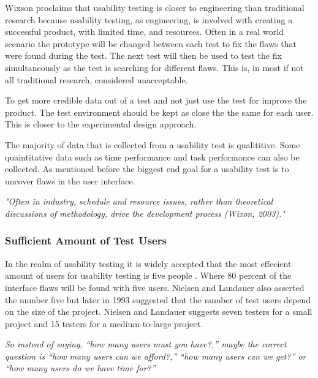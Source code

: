 Wixson proclaims that usability testing is closer to engineering than traditional research because usability testing, as engineering, is involved with creating a successful product, with limited time, and resources. Often in a real world scenario the prototype will be changed between each test to fix the flaws that were found during the test. The next test will then be used to test the fix simultaneously as the test is searching for different flaws. This is, in most if not all traditional research, considered unacceptable. 

To get more credible data out of a test and not just use the test for improve the product. The test environment should be kept as close the the same for each user. This is closer to the experimental design approach. 

The majority of data that is collected from a usability test is qualititive. Some quaintitative data such as time performance and task performance can also be collected. As mentioned before the biggest end goal for a usability test is to uncover flaws in the user interface. 

\textit{"Often in industry, schedule and resource issues, rather than theoretical discussions of methodology, drive the development process (Wixon, 2003)."}

\subsubsection{Sufficient Amount of Test Users}%
\label{ssub:Sufficient Amount of Test Users}
In the realm of usability testing it is widely accepted that the most effecient amount of users for usability testing is five people \cite{virzi1992refining}. Where 80 percent of the interface flaws will be found with five users. Nielsen and Landauer also asserted the number five but later in 1993 suggested that the number of test users depend on the size of the project\cite{nielsen1993mathematical}. Nielsen and Landauer suggests seven testers for a small project and 15 testers for a medium-to-large project. 


\textit{
So instead of saying, “how many users must you have?,” maybe the correct question is “how many users can we afford?,” “how many users can we get?” or “how many users do we have time for?”
} \cite{lazar2017research} 



\cite{nielsen1994estimating} 

\cite{nielsen1994heuristic} 


